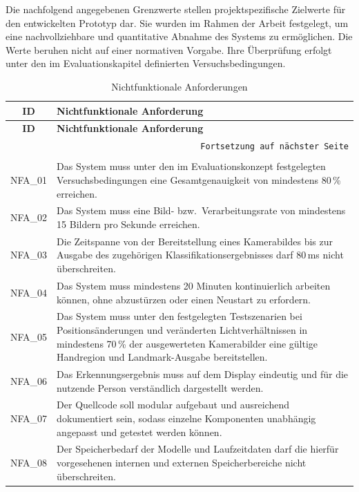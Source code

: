Die nachfolgend angegebenen Grenzwerte stellen projektspezifische Zielwerte für den entwickelten Prototyp dar. Sie wurden im Rahmen der Arbeit festgelegt, um eine nachvollziehbare und quantitative Abnahme des Systems zu ermöglichen. Die Werte beruhen nicht auf einer normativen Vorgabe. Ihre Überprüfung erfolgt unter den im Evaluationskapitel definierten Versuchsbedingungen.

\begin{longtable}{|c|p{}|}
    \hline
    \textbf{ID} & \textbf{Nichtfunktionale Anforderung} \\
    \hline
    \endfirsthead
    \hline
    \textbf{ID} & \textbf{Nichtfunktionale Anforderung} \\
    \hline
    \endhead
    \hline
    \multicolumn{2}{r}{\texttt{Fortsetzung auf nächster Seite}} \\
    \endfoot
    \caption{Nichtfunktionale Anforderungen}
    \label{tab:nichtfunktionale-anforderungen} \\
    \endlastfoot
    NFA\_01 & Das System muss unter den im Evaluationskonzept festgelegten Versuchsbedingungen eine Gesamtgenauigkeit von mindestens 80\,\% erreichen. \\
    \hline
    NFA\_02 & Das System muss eine Bild- bzw.\ Verarbeitungsrate von mindestens 15 Bildern pro Sekunde erreichen. \\
    \hline
    NFA\_03 & Die Zeitspanne von der Bereitstellung eines Kamerabildes bis zur Ausgabe des zugehörigen Klassifikationsergebnisses darf 80\,ms nicht überschreiten. \\
    \hline
    NFA\_04 & Das System muss mindestens 20 Minuten kontinuierlich arbeiten können, ohne abzustürzen oder einen Neustart zu erfordern. \\
    \hline
    NFA\_05 & Das System muss unter den festgelegten Testszenarien bei Positionsänderungen und veränderten Lichtverhältnissen in mindestens 70\,\% der ausgewerteten Kamerabilder eine gültige Handregion und Landmark-Ausgabe bereitstellen. \\
    \hline
    NFA\_06 & Das Erkennungsergebnis muss auf dem Display eindeutig und für die nutzende Person verständlich dargestellt werden. \\
    \hline
    NFA\_07 & Der Quellcode soll modular aufgebaut und ausreichend dokumentiert sein, sodass einzelne Komponenten unabhängig angepasst und getestet werden können. \\
    \hline
    NFA\_08 & Der Speicherbedarf der Modelle und Laufzeitdaten darf die hierfür vorgesehenen internen und externen Speicherbereiche nicht überschreiten. \\
    \hline
\end{longtable}

